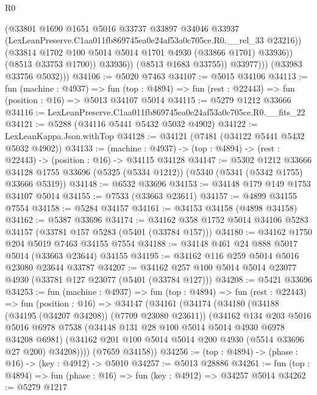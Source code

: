 \begin{lexlean}{R0}
\begin{coremodule}
                        (@33801
                          @1690
                          @1651
                          @5016
                          @33737
                          @33897
                          @34046
                          @33937
                          (LexLeanPreserve.C1aa011fb869745ea0e24af53a0c705ce.R0.__rel_33 @23216))
                        (@33814 @1702 @100 @5014 @5014 @1701 @4930 (@33866 @1701) @33936))
                      (@8513 @33753 @1700))
                    @33936))
                (@8513 @1683 @33755))
              @33977)))
        (@33983 @33756 @5032)))
@34106 := @5020 @7463
@34107 := @5015 @34106
@34113 := fun (machine : @4937) =>
  fun (top : @4894) => fun (rest : @22443) => fun (position : @16) => @5013 @34107 @5014
@34115 := @5279 @1212 @33666
@34116 := LexLeanPreserve.C1aa011fb869745ea0e24af53a0c705ce.R0.__fits_22
@34121 := @5288 (@34116 @5441 @5432 @5032 @4902)
@34122 := LexLeanKappa.Json.withTop
@34128 := @34121 (@7481 (@34122 @5441 @5432 @5032 @4902))
@34133 := (machine : @4937) -> (top : @4894) -> (rest : @22443) -> (position : @16) -> @34115 @34128
@34147 := @5302
    @1212
    @33666
    @34128
    @1755
    @33696
    (@5325 (@5334 @1212))
    (@5340 (@5341 (@5342 @1755) @33666 @5319))
@34148 := @6532 @33696
@34153 := @34148 @179 @149 @1753 @34107 @5014
@34155 := @7533 (@33663 @23611)
@34157 := @4899 @34155 @7554
@34158 := @5284 @34157
@34161 := @34153 @34158 (@4898 @34158)
@34162 := @5387 @33696
@34174 := @34162 @358 @1752 @5014 @34106 @5283 @34157 (@33781 @157 @5283 (@5401 (@33784 @157)))
@34180 := @34162 @1750 @204 @5019 @7463 @34155 @7554
@34188 := @34148 @461 @24 @888 @5017 @5014 (@33663 @23644) @34155
@34195 := @34162 @116 @259 @5014 @5016 @23080 @23644 @33787
@34207 := @34162 @257 @100 @5014 @5014 @23077 @4930 (@33781 @127 @23077 (@5401 (@33784 @127)))
@34208 := @5421 @33696
@34253 := fun (machine : @4937) =>
  fun (top : @4894) =>
  fun (rest : @22443) =>
  fun (position : @16) =>
  @34147
    (@34161
      (@34174
        (@34180
          (@34188 (@34195 (@34207 @34208)) (@7709 @23080 @23611))
          (@34162
            @134
            @203
            @5016
            @5016
            @6978
            @7538
            (@34148 @131 @28 @100 @5014 @5014 @4930 @6978 @34208 @6981)
            (@34162 @201 @100 @5014 @5014 @200 @4930 (@5514 @33696 @27 @200) @34208))))
      (@7659 @34158))
@34256 := (top : @4894) -> (phase : @16) -> (key : @4912) -> @5010
@34257 := @5013 @28886
@34261 := fun (top : @4894) => fun (phase : @16) => fun (key : @4912) => @34257 @5014
@34262 := @5279 @1217

\end{coremodule}
\end{lexlean}
